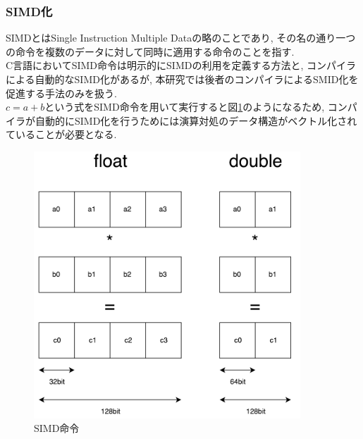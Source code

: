 \subsubsection{SIMD化}
\label{subsubsec:simd}
SIMDとはSingle Instruction Multiple Dataの略のことであり, その名の通り一つの命令を複数のデータに対して同時に適用する命令のことを指す.\\
C言語においてSIMD命令は明示的にSIMDの利用を定義する方法と, コンパイラによる自動的なSIMD化があるが,
本研究では後者のコンパイラによるSMID化を促進する手法のみを扱う.\\
$c = a + b$という式をSIMD命令を用いて実行すると図\ref{fig:simd-image}のようになるため,
コンパイラが自動的にSIMD化を行うためには演算対処のデータ構造がベクトル化されていることが必要となる.\\
\begin{figure}[htb]
 \begin{center}
    \includegraphics[width=10cm]{./images/SIMD.pdf}
    \caption{SIMD命令}
    \label{fig:simd-image}
  \end{center}
\end{figure}~\\

